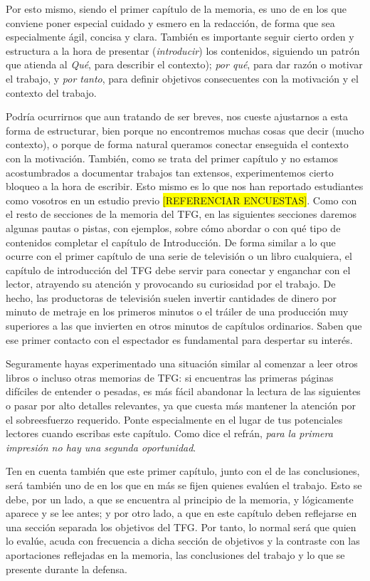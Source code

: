 Por esto mismo, siendo el primer capítulo de la memoria, es uno de en los que conviene poner especial cuidado y esmero en la redacción, de forma que sea especialmente ágil, concisa y clara. También es importante seguir cierto orden y estructura a la hora de presentar (\textit{introducir}) los contenidos, siguiendo un patrón que atienda al \textit{Qué}, para describir el contexto); \textit{por qué}, para dar razón o motivar el trabajo, y \textit{por tanto}, para definir objetivos consecuentes con la motivación y el contexto del trabajo.

Podría ocurrirnos que aun tratando de ser breves, nos cueste ajustarnos a esta forma de estructurar, bien porque no encontremos muchas cosas que decir (mucho contexto), o porque de forma natural queramos conectar enseguida el contexto con la motivación. También, como se trata del primer capítulo y no estamos acostumbrados a documentar trabajos tan extensos, experimentemos cierto bloqueo a la hora de escribir. Esto mismo es lo que nos han reportado estudiantes como vosotros en un estudio previo \colorbox{yellow}{[REFERENCIAR ENCUESTAS]}. Como con el resto de secciones de la memoria del TFG, en las siguientes secciones daremos algunas pautas o pistas, con ejemplos, sobre cómo abordar o con qué tipo de contenidos completar el capítulo de Introducción. De forma similar a lo que ocurre con el primer capítulo de una serie de televisión o un libro cualquiera, el capítulo de introducción del TFG debe servir para conectar y enganchar con el lector, atrayendo su atención y provocando su curiosidad por el trabajo. De hecho, las productoras de televisión suelen invertir cantidades de dinero por minuto de metraje en los primeros minutos o el tráiler de una producción muy superiores a las que invierten en otros minutos de capítulos ordinarios. Saben que ese primer contacto con el espectador es fundamental para despertar su interés.

Seguramente hayas experimentado una situación similar al comenzar a leer otros libros o incluso otras memorias de TFG: si encuentras las primeras páginas difíciles de entender o pesadas, es más fácil abandonar la lectura de las siguientes o pasar por alto detalles relevantes, ya que cuesta más mantener la atención por el sobreesfuerzo requerido. Ponte especialmente en el lugar de tus potenciales lectores cuando escribas este capítulo. Como dice el refrán, \textit{para la primera impresión no hay una segunda oportunidad}.

Ten en cuenta también que este primer capítulo, junto con el de las conclusiones, será también uno de en los que en más se fijen quienes evalúen el trabajo. Esto se debe, por un lado, a que se encuentra al principio de la memoria, y lógicamente aparece y se lee antes; y por otro lado, a que en este capítulo deben reflejarse en una sección separada los objetivos del TFG. Por tanto, lo normal será que quien lo evalúe, acuda con frecuencia a dicha sección de objetivos y la contraste con las aportaciones reflejadas en la memoria, las conclusiones del trabajo y lo que se presente durante la defensa. 

